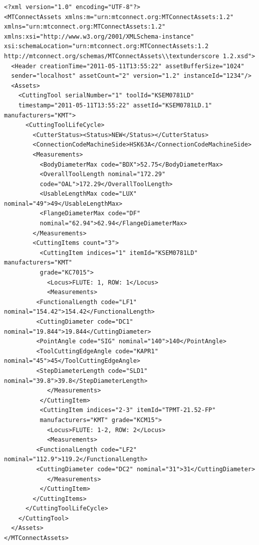 \begin{lstlisting}[firstnumber=1,escapechar=|,% 
caption={Example for Step Drill with Explicate Loci}, label={lst:step-drill-with-explicate-loci}]
<?xml version="1.0" encoding="UTF-8"?>
<MTConnectAssets xmlns:m="urn:mtconnect.org:MTConnectAssets:1.2" 
xmlns="urn:mtconnect.org:MTConnectAssets:1.2" 
xmlns:xsi="http://www.w3.org/2001/XMLSchema-instance" 
xsi:schemaLocation="urn:mtconnect.org:MTConnectAssets:1.2 
http://mtconnect.org/schemas/MTConnectAssets\\textunderscore 1.2.xsd">
  <Header creationTime="2011-05-11T13:55:22" assetBufferSize="1024" 
  sender="localhost" assetCount="2" version="1.2" instanceId="1234"/>
  <Assets>
    <CuttingTool serialNumber="1" toolId="KSEM0781LD" 
    timestamp="2011-05-11T13:55:22" assetId="KSEM0781LD.1" manufacturers="KMT">
      <CuttingToolLifeCycle>
        <CutterStatus><Status>NEW</Status></CutterStatus>
        <ConnectionCodeMachineSide>HSK63A</ConnectionCodeMachineSide>
        <Measurements>
          <BodyDiameterMax code="BDX">52.75</BodyDiameterMax>
          <OverallToolLength nominal="172.29" 
          code="OAL">172.29</OverallToolLength>
          <UsableLengthMax code="LUX" nominal="49">49</UsableLengthMax>
          <FlangeDiameterMax code="DF" 
          nominal="62.94">62.94</FlangeDiameterMax>
        </Measurements>
        <CuttingItems count="3">
          <CuttingItem indices="1" itemId="KSEM0781LD" manufacturers="KMT" 
          grade="KC7015">
            <Locus>FLUTE: 1, ROW: 1</Locus>
            <Measurements>
         <FunctionalLength code="LF1" nominal="154.42">154.42</FunctionalLength>
         <CuttingDiameter code="DC1" nominal="19.844">19.844</CuttingDiameter>
         <PointAngle code="SIG" nominal="140">140</PointAngle>
         <ToolCuttingEdgeAngle code="KAPR1" nominal="45">45</ToolCuttingEdgeAngle>
         <StepDiameterLength code="SLD1" nominal="39.8">39.8</StepDiameterLength>
            </Measurements>
          </CuttingItem>
          <CuttingItem indices="2-3" itemId="TPMT-21.52-FP" 
          manufacturers="KMT" grade="KCM15">
            <Locus>FLUTE: 1-2, ROW: 2</Locus>
            <Measurements>
         <FunctionalLength code="LF2" nominal="112.9">119.2</FunctionalLength>
         <CuttingDiameter code="DC2" nominal="31">31</CuttingDiameter>
            </Measurements>
          </CuttingItem>
        </CuttingItems>
      </CuttingToolLifeCycle>
    </CuttingTool>
  </Assets>
</MTConnectAssets>
\end{lstlisting}

